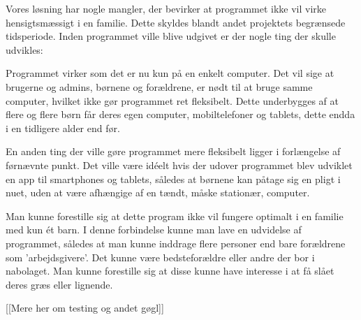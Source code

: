 Vores løsning har nogle mangler, der bevirker at programmet ikke vil virke hensigtsmæssigt i en familie. Dette skyldes blandt andet projektets begrænsede tidsperiode. Inden programmet ville blive udgivet er der nogle ting der skulle udvikles:

Programmet virker som det er nu kun på en enkelt computer. Det vil sige at brugerne og admins, børnene og forældrene, er nødt til at bruge samme computer, hvilket ikke gør programmet ret fleksibelt. Dette underbygges af at flere og flere børn får deres egen computer, mobiltelefoner og tablets, dette endda i en tidligere alder end før.\cite{MobilAlder}

En anden ting der ville gøre programmet mere fleksibelt ligger i forlængelse af førnævnte punkt. Det ville være idéelt hvis der udover programmet blev udviklet en app til smartphones og tablets, således at børnene kan påtage sig en pligt i nuet, uden at være afhængige af en tændt, måske stationær, computer.

Man kunne forestille sig at dette program ikke vil fungere optimalt i en familie med kun ét barn. I denne forbindelse kunne man lave en udvidelse af programmet, således at man kunne inddrage flere personer end bare forældrene som 'arbejdsgivere'. Det kunne være bedsteforældre eller andre der bor i nabolaget. Man kunne forestille sig at disse kunne have interesse i at få slået deres græs eller lignende.

[[Mere her om testing og andet gøgl]]

